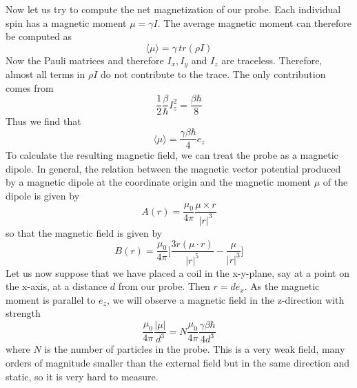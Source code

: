 \documentclass[a4paper, draft]{article}
\theoremstyle{own}
\theoremstyle{remark}
\begin{document}
Now let us try to compute the net magnetization of our probe. Each individual spin has a magnetic moment $\mu = \gamma I$. The average magnetic moment can therefore be computed as
$$
\langle \mu \rangle = \gamma \, tr(\rho I) 
$$
Now the Pauli matrices and therefore $I_x, I_y$ and $I_z$ are traceless. Therefore, almost all terms in $\rho I$ do not contribute to the trace. The only contribution comes from 
$$
\frac{1}{2} \frac{\beta}{\hbar} I_z^2 = \frac{\beta \hbar}{8}
$$
Thus we find that
$$
\langle \mu \rangle = \frac{\gamma \beta \hbar}{4} e_z
$$
To calculate the resulting magnetic field, we can treat the probe as a magnetic dipole. In general, the relation between the magnetic vector potential produced by a magnetic dipole at the coordinate origin and the magnetic moment $\mu$ of the dipole is given by
$$
A(r) = \frac{\mu_0}{4\pi} \frac{\mu \times r}{|r|^3}
$$
so that the magnetic field is given by
$$
B(r) = \frac{\mu_0}{4\pi} \big[  \frac{3r(\mu \cdot r)}{|r|^5} - \frac{\mu}{|r|^3}\big] 
$$
Let us now suppose that we have placed a coil in the x-y-plane, say at a point on the x-axis, at a distance $d$ from our probe. Then $r = d e_x$. As the magnetic moment is parallel to $e_z$, we will observe a magnetic field in the z-direction with strength
$$
\frac{\mu_0}{4\pi} \frac{|\mu|}{d^3} = N \frac{\mu_0}{4\pi} \frac{\gamma \beta \hbar}{4d^3}
$$
where $N$ is the number of particles in the probe. This is a very weak field, many orders of magnitude smaller than the external field but in the same direction and static, so it is very hard to measure.
\end{document}
